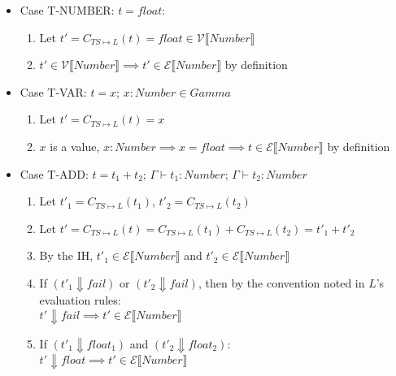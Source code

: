 \documentclass{article}
\newcommand{\denoteset}[2]{\mathcal{#1} \llbracket #2 \rrbracket}
\begin{document}
	\begin{itemize}
		\item Case T-NUMBER: $t = float$:
		\begin{enumerate}
			\item Let $t' = C_{TS \mapsto L}(t) = float \in \denoteset{V}{Number}$
			\item $t' \in \denoteset{V}{Number} \implies t' \in \denoteset{E}{Number}$ by definition
		\end{enumerate}
		
		\item Case T-VAR: $t = x$; $x: Number \in Gamma$
		\begin{enumerate}
			\item Let $t' = C_{TS \mapsto L}(t) = x$
			\item $x$ is a value, $x: Number \implies x = float \implies t \in \denoteset{E}{Number}$ by definition
		\end{enumerate}
	
		\item Case T-ADD: $t = t_1 + t_2$; $\Gamma \vdash t_1: Number$; $\Gamma \vdash t_2: Number$
		\begin{enumerate}
			\item Let $t'_1 = C_{TS \mapsto L}(t_1)$, $t'_2 = C_{TS \mapsto L}(t_2)$
			\item Let $t' = C_{TS \mapsto L}(t) = C_{TS \mapsto L}(t_1) + C_{TS \mapsto L}(t_2) = t'_1 + t'_2$
			\item By the IH, $t'_1 \in \denoteset{E}{Number}$ and $t'_2 \in \denoteset{E}{Number}$
			\item If $(t'_1 \Downarrow fail)$ or $(t'_2 \Downarrow fail)$, then by the convention noted in $L$'s evaluation rules:\\
				$t' \Downarrow fail \implies t' \in \denoteset{E}{Number}$
			\item If $(t'_1 \Downarrow float_1)$ and $(t'_2 \Downarrow float_2)$:\\
				$t' \Downarrow float \implies t' \in \denoteset{E}{Number}$
		\end{enumerate}
	

\end{itemize}
\end{document}
